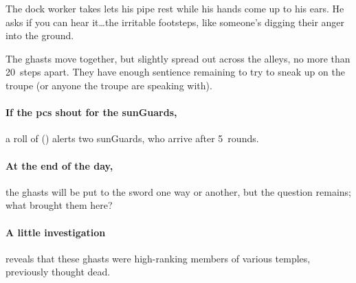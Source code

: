 \begin{boxtext}
  The dock worker takes lets his pipe rest while his hands come up to his ears.
  He asks if you can hear it\ldots the irritable footsteps, like someone's digging their anger into the ground.
\end{boxtext}

The ghasts move together, but slightly spread out across the alleys, no more than 20~\glspl{step} apart.
They have enough sentience remaining to try to sneak up on the troupe (or anyone the troupe are speaking with).

\paragraph{If the \glspl{pc} shout for the \glspl{sunGuard},}
a roll of  (\tn[7]) alerts two \glspl{sunGuard}, who arrive after 5~\glspl{round}.

\paragraph{At the end of the day,}
the ghasts will be put to the sword one way or another, but the question remains; what brought them here?

\paragraph{A little investigation}
reveals that these ghasts were high-ranking members of various temples, previously thought dead.


